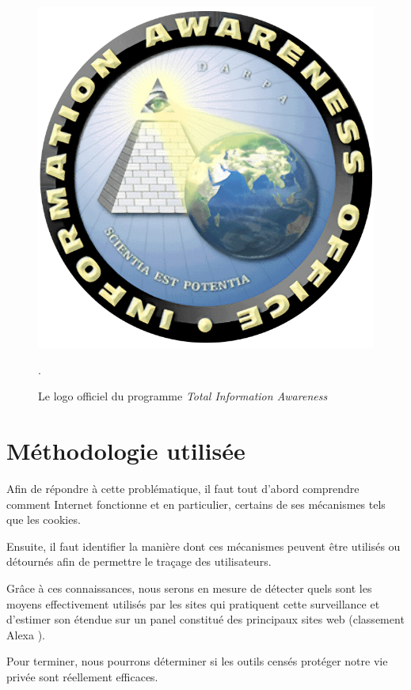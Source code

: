 \begin{figure}[h]
	\centering
	\includegraphics[scale=0.2]{figures/IAO-logo.png}
	\caption{\label{IAO_logo}Le logo officiel du programme \textit{Total Information Awareness}}.
\end{figure}


\section{Méthodologie utilisée}
Afin de répondre à cette problématique, il faut tout d'abord comprendre comment Internet fonctionne et en particulier, certains de ses mécanismes tels que les cookies.

Ensuite, il faut identifier la manière dont ces mécanismes peuvent être utilisés ou détournés afin de permettre le traçage des utilisateurs.

Grâce à ces connaissances, nous serons en mesure de détecter quels sont les moyens effectivement utilisés par les sites qui pratiquent cette surveillance et d'estimer son étendue sur un panel constitué des principaux sites web (classement Alexa \cite{AlexaTop}).

Pour terminer, nous pourrons déterminer si les outils censés protéger notre vie privée sont réellement efficaces. %

